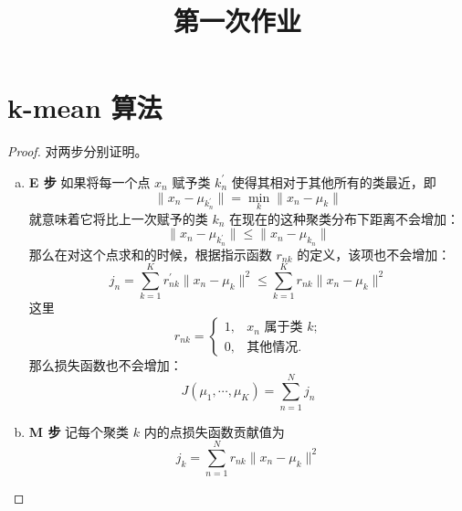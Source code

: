 
    \title{第一次作业}
    \maketitle
    
    \section{k-mean 算法}

    \begin{proof}
        对两步分别证明。

        \begin{enumerate}[(a)]
            \item \textbf{E 步} 如果将每一个点 $x_n$ 赋予类 $k_n^\prime$ 使得其相对于其他所有的类最近，即
            \begin{equation*}
                \| x_n-\mu_{k_n^\prime} \| = \min_k{\| x_n - \mu_k\|}
            \end{equation*}
            就意味着它将比上一次赋予的类 $k_n$ 在现在的这种聚类分布下距离不会增加：
            \begin{equation*}
                \| x_n-\mu_{k_n^\prime} \| \leq \| x_n-\mu_{k_n} \|
            \end{equation*}
            那么在对这个点求和的时候，根据指示函数 $r_{nk}$ 的定义，该项也不会增加：
            \begin{equation*}
                j_n = \sum_{k=1}^K r_{nk}^{\prime}\| x_n - \mu_k \|^2 \leq \sum_{k=1}^K r_{nk}\| x_n - \mu_k \|^2
            \end{equation*}
            这里
            \begin{equation*}
                r_{nk} = \begin{cases}
                    1, & \text{$x_n$ 属于类 $k$;}\\
                    0, & \text{其他情况.}
                \end{cases}
            \end{equation*}
            那么损失函数也不会增加：
            \begin{equation}
                J(\mu_1,\cdots,\mu_K) = \sum_{n=1}^N j_n
            \end{equation}
            \item \textbf{M 步} 
            记每个聚类 $k$ 内的点损失函数贡献值为
            \begin{equation}\label{eq:cluster}
                j_k = \sum_{n=1}^N r_{nk}\|x_n-\mu_k\|^2

\end{equation}
\end{enumerate}
\end{proof}
